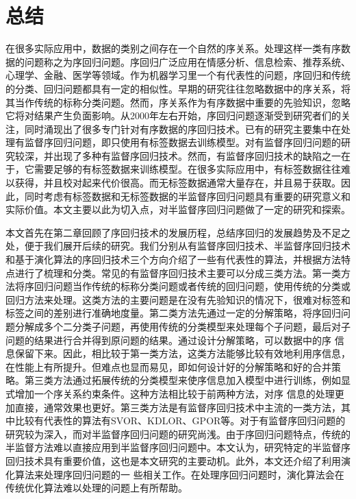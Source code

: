 \chapter{总结}
\label{chap:conclusion}

在很多实际应用中，数据的类别之间存在一个自然的序关系。处理这样一类有序数据的问题称之为序回归问题。序回归广泛应用在情感分析、信息检索、推荐系统、心理学、金融、医学等领域。作为机器学习里一个有代表性的问题，序回归和传统的分类、回归问题都具有一定的相似性。早期的研究往往忽略数据中的序关系，将其当作传统的标称分类问题。然而，序关系作为有序数据中重要的先验知识，忽略它将对结果产生负面影响。从2000年左右开始，序回归问题逐渐受到研究者们的关注，同时涌现出了很多专门针对有序数据的序回归技术。已有的研究主要集中在处理有监督序回归问题，即只使用有标签数据去训练模型。对有监督序回归问题的研究较深，并出现了多种有监督序回归技术。然而，有监督序回归技术的缺陷之一在于，它需要足够的有标签数据来训练模型。在很多实际应用中，有标签数据往往难以获得，并且校对起来代价很高。而无标签数据通常大量存在，并且易于获取。因此，同时考虑有标签数据和无标签数据的半监督序回归问题具有重要的研究意义和实际价值。本文主要以此为切入点，对半监督序回归问题做了一定的研究和探索。

本文首先在第二章回顾了序回归技术的发展历程，总结序回归的发展趋势及不足之处，便于我们展开后续的研究。我们分别从有监督序回归技术、半监督序回归技术和基于演化算法的序回归技术三个方向介绍了一些有代表性的算法，并根据方法特点进行了梳理和分类。常见的有监督序回归技术主要可以分成三类方法。第一类方法将序回归问题当作传统的标称分类问题或者传统的回归问题，使用传统的分类或回归方法来处理。这类方法的主要问题是在没有先验知识的情况下，很难对标签和标签之间的差别进行准确地度量。第二类方法先通过一定的分解策略，将序回归问题分解成多个二分类子问题，再使用传统的分类模型来处理每个子问题，最后对子问题的结果进行合并得到原问题的结果。通过设计分解策略，可以数据中的序 信息保留下来。因此，相比较于第一类方法，这类方法能够比较有效地利用序信息，在性能上有所提升。但难点也显而易见，即如何设计好的分解策略和好的合并策略。第三类方法通过拓展传统的分类模型来使序信息加入模型中进行训练，例如显式增加一个序关系约束条件。这种方法相比较于前两种方法，对序 信息的处理更加直接，通常效果也更好。第三类方法是有监督序回归技术中主流的一类方法，其中比较有代表性的算法有SVOR、KDLOR、GPOR等。对于有监督序回归问题的研究较为深入，而对半监督序回归问题的研究尚浅。由于序回归问题特点，传统的半监督方法难以直接应用到半监督序回归问题中。本文认为，研究特定的半监督序回归技术具有重要价值，这也是本文研究的主要动机。此外，本文还介绍了利用演化算法来处理序回归问题的一 些相关工作。在处理序回归问题时，演化算法会在传统优化算法难以处理的问题上有所帮助。


